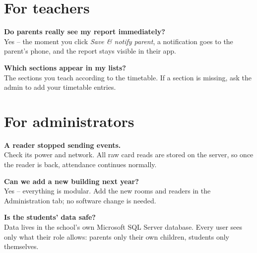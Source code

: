 \section*{For teachers}

\textbf{Do parents really see my report immediately?}\\
Yes -- the moment you click \emph{Save \& notify parent}, a notification
goes to the parent's phone, and the report stays visible in their app.

\textbf{Which sections appear in my lists?}\\
The sections you teach according to the timetable. If a section is
missing, ask the admin to add your timetable entries.

\section*{For administrators}

\textbf{A reader stopped sending events.}\\
Check its power and network. All raw card reads are stored on the
server, so once the reader is back, attendance continues normally.

\textbf{Can we add a new building next year?}\\
Yes -- everything is modular. Add the new rooms and readers in the
Administration tab; no software change is needed.

\textbf{Is the students' data safe?}\\
Data lives in the school's own Microsoft SQL Server database. Every
user sees only what their role allows: parents only their own
children, students only themselves.
